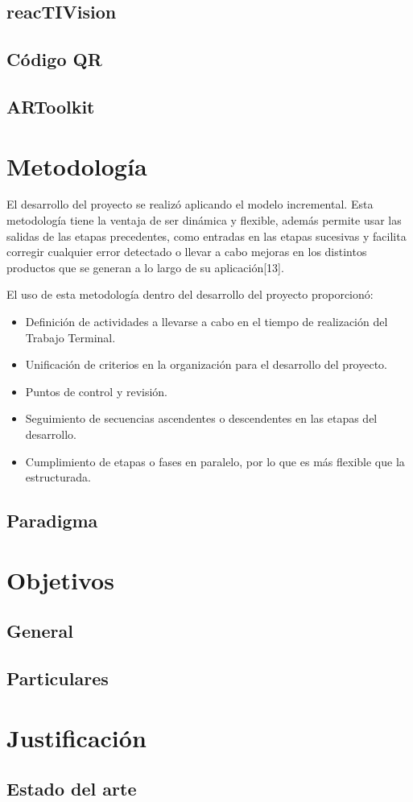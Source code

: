 \subsection{reacTIVision}

\subsection{Código QR}
\subsection{ARToolkit}

\section{Metodología}

El desarrollo del proyecto se realizó aplicando el modelo incremental. %
Esta metodología tiene la ventaja de ser dinámica y flexible, además permite usar las salidas de las etapas precedentes, 
como entradas en las etapas sucesivas y facilita corregir cualquier error detectado o llevar a cabo mejoras en 
los distintos productos que se generan a lo largo de su aplicación[13]. 

El uso de esta metodología dentro del desarrollo del proyecto proporcionó:
\begin{itemize}
\item Definición de actividades a llevarse a cabo en el tiempo de realización del Trabajo Terminal.
\item Unificación de criterios en la organización para el desarrollo del proyecto.
\item Puntos de control y revisión.
\item Seguimiento de secuencias ascendentes o descendentes en las etapas del desarrollo.
\item Cumplimiento de etapas o fases en paralelo, por lo que es más flexible que la estructurada.
\end{itemize}

\subsection{Paradigma}

\section{Objetivos}

\subsection{General}
\subsection{Particulares}

\section{Justificación}

\subsection{Estado del arte}



